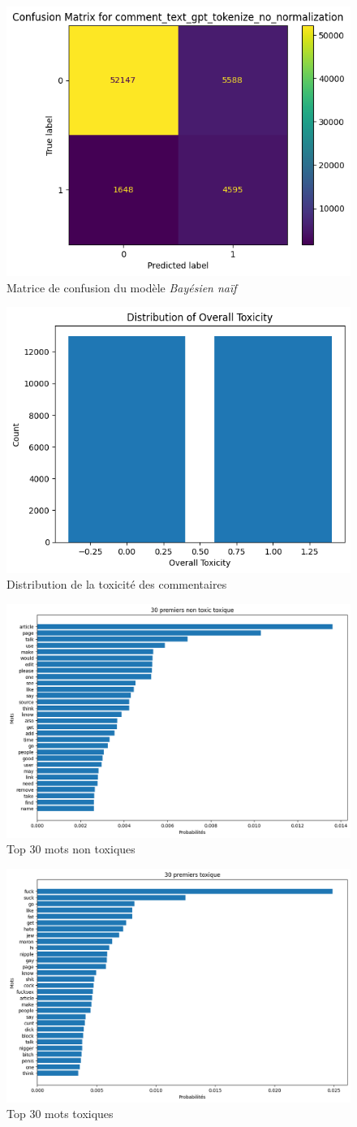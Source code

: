     
    \begin{figure}[ht]
        \caption{Matrice de confusion du modèle \textit{Bayésien naïf}}
        \centering
        \includegraphics[width=.49\linewidth]{figures/matrix-confusion-naive_bayes.png}
    \end{figure}

    \begin{figure}[ht]
        \caption{Distribution de la toxicité des commentaires}
        \centering
        \includegraphics[width=.43\linewidth]{figures/distribution-toxicity-naive_bayes.png}
    \end{figure}

    \begin{figure}[htbp]
        \centering
        \includegraphics[width=.7\linewidth]{figures/30_first_non_toxic-naive_bayes.png}
        \caption{Top 30 mots non toxiques}
    \end{figure}

    \begin{figure}[htbp]
        \centering
        \includegraphics[width=.7\linewidth]{figures/30_first_toxic-naive_bayes.png}
        \caption{Top 30 mots toxiques}
    \end{figure}